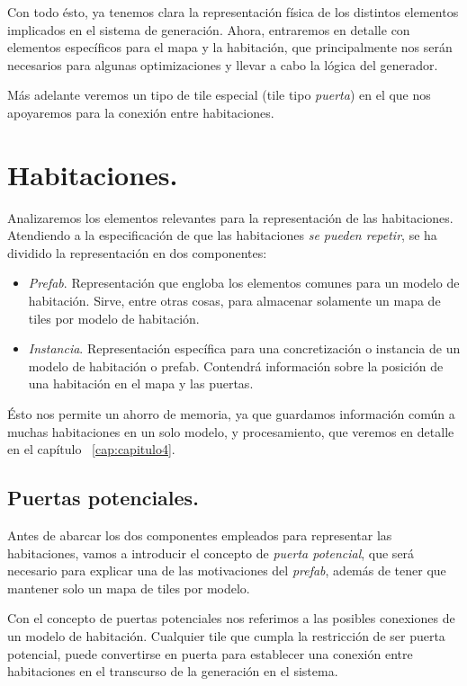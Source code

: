 Con todo ésto, ya tenemos clara la representación física de los distintos elementos implicados en el sistema de generación. Ahora, entraremos en detalle con elementos específicos para el mapa y la habitación, que principalmente nos serán necesarios para algunas optimizaciones y llevar a cabo la lógica del generador.

Más adelante veremos un tipo de tile especial (tile tipo \emph{puerta}) en el que nos apoyaremos para la conexión entre habitaciones.

\section{Habitaciones.}

Analizaremos los elementos relevantes para la representación de las habitaciones. Atendiendo a la especificación de que las habitaciones \emph{se pueden repetir}, se ha dividido la representación en dos componentes:

\begin{itemize}
	\item \emph{Prefab}. Representación que engloba los elementos comunes para un modelo de habitación. Sirve, entre otras cosas, para almacenar solamente un mapa de tiles por modelo de habitación.
	\item \emph{Instancia}. Representación específica para una concretización o instancia de un modelo de habitación o prefab. Contendrá información sobre la posición de una habitación en el mapa y las puertas.
\end{itemize}

Ésto nos permite un ahorro de memoria, ya que guardamos información común a muchas habitaciones en un solo modelo, y procesamiento, que veremos en detalle en el capítulo ~\ref{cap:capitulo4}.

\subsection{Puertas potenciales.}

Antes de abarcar los dos componentes empleados para representar las habitaciones, vamos a introducir el concepto de \emph{puerta potencial}, que será necesario para explicar una de las motivaciones del \emph{prefab}, además de tener que mantener solo un mapa de tiles por modelo.

Con el concepto de puertas potenciales nos referimos a las posibles conexiones de un modelo de habitación. Cualquier tile que cumpla la restricción de ser puerta potencial, puede convertirse en puerta para establecer una conexión entre habitaciones en el transcurso de la generación en el sistema.

